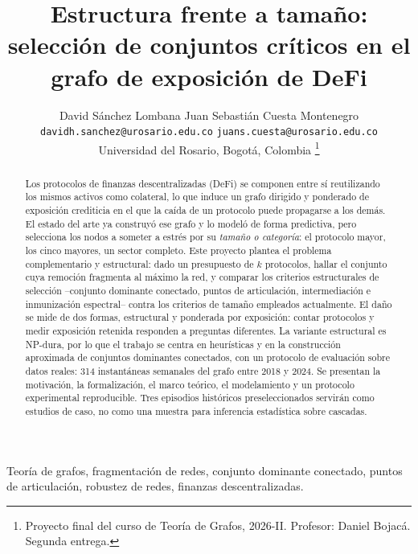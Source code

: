 \documentclass[journal]{IEEEtran}
\begin{document}
\title{Estructura frente a tamaño: selección de conjuntos críticos
en el grafo de exposición de DeFi}

\author{David Sánchez Lombana \quad Juan Sebastián Cuesta Montenegro\\[2pt]
{\small\texttt{davidh.sanchez@urosario.edu.co} \quad
\texttt{juans.cuesta@urosario.edu.co}}\\[2pt]
{\small Universidad del Rosario, Bogotá, Colombia}%
\thanks{Proyecto final del curso de Teoría de Grafos, 2026-II.
Profesor: Daniel Bojacá. Segunda entrega.}}

\pagestyle{plain}

\maketitle

\begin{abstract}
Los protocolos de finanzas descentralizadas (DeFi) se componen entre sí
reutilizando los mismos activos como colateral, lo que induce un grafo dirigido
y ponderado de exposición crediticia en el que la caída de un protocolo puede
propagarse a los demás. El estado del arte ya construyó ese grafo y lo modeló
de forma predictiva, pero selecciona los nodos a someter a estrés por su
\emph{tamaño o categoría}: el protocolo mayor, los cinco mayores, un sector
completo.
Este proyecto plantea el problema complementario y estructural: dado un
presupuesto de $k$ protocolos, hallar el conjunto cuya remoción fragmenta al
máximo la red, y comparar los criterios estructurales de selección --conjunto
dominante conectado, puntos de articulación, intermediación e inmunización
espectral-- contra los criterios de tamaño empleados actualmente. El daño se
mide de dos formas, estructural y ponderada por exposición: contar protocolos
y medir exposición retenida responden a preguntas diferentes.
La variante estructural es NP-dura, por lo que el trabajo se centra en
heurísticas y en la construcción aproximada de conjuntos dominantes conectados,
con un protocolo de evaluación sobre datos reales: 314 instantáneas
semanales del grafo entre 2018 y 2024. Se presentan la motivación, la
formalización, el marco teórico, el modelamiento y un protocolo experimental
reproducible. Tres episodios históricos preseleccionados servirán como estudios
de caso, no como una muestra para inferencia estadística sobre cascadas.
\end{abstract}

\begin{IEEEkeywords}
Teoría de grafos, fragmentación de redes, conjunto dominante conectado,
puntos de articulación, robustez de redes, finanzas descentralizadas.
\end{IEEEkeywords}
\end{document}
